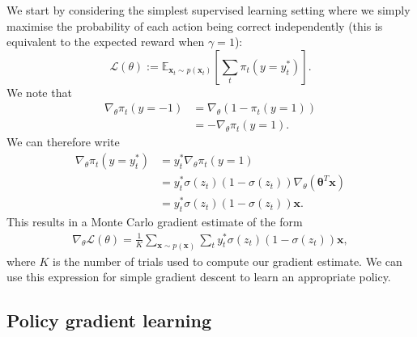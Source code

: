 \documentclass{article}
\renewcommand\b\bm
\renewcommand\b\bm
\begin{document}
We start by considering the simplest supervised learning setting where we simply maximise the probability of each action being correct independently (this is equivalent to the expected reward when $\gamma = 1$):
\begin{equation}
    \mathcal{L}(\theta) := \mathbb{E}_{\b{x}_t \sim p(\b{x}_t)} \left [ \sum_t \pi_t (y = y^*_t) \right ].
\end{equation}
We note that
\begin{align}
    \nabla_\theta \pi_t (y = -1) &= \nabla_\theta (1 - \pi_t (y = 1))\\
    &= - \nabla_\theta \pi_t (y = 1).
\end{align}
We can therefore write
\begin{align}
    \nabla_\theta \pi_t (y = y^*_t) &= y^*_t \nabla_\theta \pi_t(y = 1)\\
    &= y^*_t \sigma(z_t) (1-\sigma(z_t)) \nabla_\theta (\b{\theta}^T \b{x})\\
    &= y^*_t \sigma(z_t) (1-\sigma(z_t)) \b{x}.
\end{align}
This results in a Monte Carlo gradient estimate of the form
\begin{align}
    \nabla_\theta \mathcal{L}(\theta) = \frac{1}{K} \sum_{\b{x} \sim p(\b{x})} \sum_t y^*_t \sigma(z_t) (1-\sigma(z_t)) \b{x},
\end{align}
where $K$ is the number of trials used to compute our gradient estimate.
We can use this expression for simple gradient descent to learn an appropriate policy.

\subsection*{Policy gradient learning}
\end{document}
